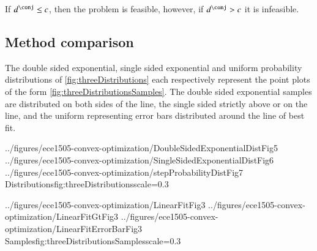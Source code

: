 If \( d^\conj \le c \), then the problem is feasible, however, if \( d^\conj > c \) it is infeasible.

\subsection{Method comparison}

The double sided exponential, single sided exponential and uniform probability distributions of \cref{fig:threeDistributions} each respectively represent the point plots of the form \cref{fig:threeDistributionsSamples}.  The double sided exponential samples are distributed on both sides of the line, the single sided strictly above or on the line, and the uniform representing error bars distributed around the line of best fit.

\imageThreeFiguresOneLine
{../figures/ece1505-convex-optimization/DoubleSidedExponentialDistFig5}
{../figures/ece1505-convex-optimization/SingleSidedExponentialDistFig6}
{../figures/ece1505-convex-optimization/stepProbabilityDistFig7}
{Distributions}{fig:threeDistributions}{scale=0.3}

\imageThreeFiguresOneLine
{../figures/ece1505-convex-optimization/LinearFitFig3}
{../figures/ece1505-convex-optimization/LinearFitGtFig3}
{../figures/ece1505-convex-optimization/LinearFitErrorBarFig3}
{Samples}{fig:threeDistributionsSamples}{scale=0.3}
